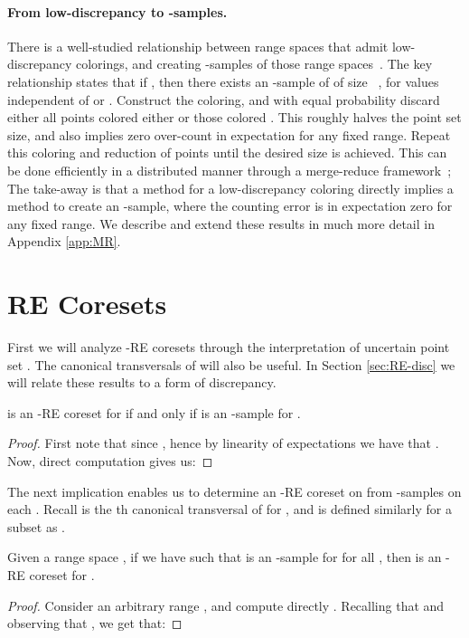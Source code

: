 \documentclass[11pt]{myclass}
\newcommand{\RE}{\textsf{RE}\xspace}
\newcommand{\Paragraph}[1]{\paragraph{\sffamily\textbf{#1.}}}
\begin{document}
\Paragraph{From low-discrepancy to -samples}
There is a well-studied relationship between range spaces that admit low-discrepancy colorings, and creating -samples of those range spaces~\cite{CM96,Mat99,Cha01,Bec81a}.  The key relationship states that if , then there exists an -sample of  of size ~\cite{Phi08}, for values  independent of  or .  
Construct the coloring, and with equal probability discard either all points colored 
either  or those colored .  This roughly halves the point set size, and also implies zero over-count in expectation for any fixed range.  Repeat this coloring and reduction of points until the desired size is achieved.  This can be done efficiently in a distributed manner through a merge-reduce framework~\cite{CM96};   
The take-away is that a method for a low-discrepancy coloring directly implies a method to create an -sample, where the counting error is in expectation zero for any fixed range.  
We describe and extend these results in much more detail in Appendix \ref{app:MR}.  

\section{\RE Coresets}\label{sec:rec}
First we will analyze -\RE coresets through the  interpretation of uncertain point set .  The canonical transversals  of  will also be useful.  In Section \ref{sec:RE-disc} we will relate these results to a form of discrepancy.  

\begin{lemma}\label{lem:certtocomp}
  is an -\RE coreset for  if and only if  is an -sample for .  
\end{lemma}
\begin{proof}
First note that since  , hence by linearity of expectations we have that 
. 
Now, direct computation gives us:

\end{proof}

The next implication enables us to determine an -\RE coreset on  from -samples on each .  Recall  is the th canonical transversal of  for , and is defined similarly for a subset  as .
 

\begin{lemma}\label{lem:eachcomp}
Given a range space , if we have  such that  is an -sample for  for all , then  is an -\RE coreset for . 
\end{lemma}

\begin{proof} Consider an arbitrary range , and compute directly  
 .
Recalling that 
and observing that , we get that:

\end{proof}
\end{document}
